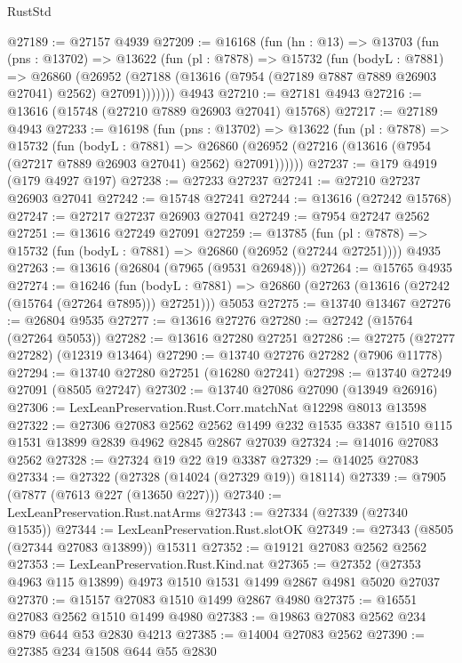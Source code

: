 \begin{lexlean}{RustStd}
\begin{coremodule}
@27189 := @27157 @4939
@27209 := @16168
    (fun (hn : @13) =>
    @13703
      (fun (pns : @13702) =>
      @13622
        (fun (pl : @7878) =>
        @15732
          (fun (bodyL : @7881) =>
          @26860
            (@26952 (@27188 (@13616 (@7954 (@27189 @7887 @7889 @26903 @27041) @2562) @27091)))))))
    @4943
@27210 := @27181 @4943
@27216 := @13616 (@15748 (@27210 @7889 @26903 @27041) @15768)
@27217 := @27189 @4943
@27233 := @16198
    (fun (pns : @13702) =>
    @13622
      (fun (pl : @7878) =>
      @15732
        (fun (bodyL : @7881) =>
        @26860 (@26952 (@27216 (@13616 (@7954 (@27217 @7889 @26903 @27041) @2562) @27091))))))
@27237 := @179 @4919 (@179 @4927 @197)
@27238 := @27233 @27237
@27241 := @27210 @27237 @26903 @27041
@27242 := @15748 @27241
@27244 := @13616 (@27242 @15768)
@27247 := @27217 @27237 @26903 @27041
@27249 := @7954 @27247 @2562
@27251 := @13616 @27249 @27091
@27259 := @13785
    (fun (pl : @7878) => @15732 (fun (bodyL : @7881) => @26860 (@26952 (@27244 @27251))))
    @4935
@27263 := @13616 (@26804 (@7965 (@9531 @26948)))
@27264 := @15765 @4935
@27274 := @16246
    (fun (bodyL : @7881) => @26860 (@27263 (@13616 (@27242 (@15764 (@27264 @7895))) @27251)))
    @5053
@27275 := @13740 @13467
@27276 := @26804 @9535
@27277 := @13616 @27276
@27280 := @27242 (@15764 (@27264 @5053))
@27282 := @13616 @27280 @27251
@27286 := @27275 (@27277 @27282) (@12319 @13464)
@27290 := @13740 @27276 @27282 (@7906 @11778)
@27294 := @13740 @27280 @27251 (@16280 @27241)
@27298 := @13740 @27249 @27091 (@8505 @27247)
@27302 := @13740 @27086 @27090 (@13949 @26916)
@27306 := LexLeanPreservation.Rust.Corr.matchNat @12298 @8013 @13598
@27322 := @27306
    @27083
    @2562
    @2562
    @1499
    @232
    @1535
    @3387
    @1510
    @115
    @1531
    @13899
    @2839
    @4962
    @2845
    @2867
    @27039
@27324 := @14016 @27083 @2562
@27328 := @27324 @19 @22 @19 @3387
@27329 := @14025 @27083
@27334 := @27322 (@27328 (@14024 (@27329 @19)) @18114)
@27339 := @7905 (@7877 (@7613 @227 (@13650 @227)))
@27340 := LexLeanPreservation.Rust.natArms
@27343 := @27334 (@27339 (@27340 @1535))
@27344 := LexLeanPreservation.Rust.slotOK
@27349 := @27343 (@8505 (@27344 @27083 @13899)) @15311
@27352 := @19121 @27083 @2562 @2562
@27353 := LexLeanPreservation.Rust.Kind.nat
@27365 := @27352 (@27353 @4963 @115 @13899) @4973 @1510 @1531 @1499 @2867 @4981 @5020 @27037
@27370 := @15157 @27083 @1510 @1499 @2867 @4980
@27375 := @16551 @27083 @2562 @1510 @1499 @4980
@27383 := @19863 @27083 @2562 @234 @879 @644 @53 @2830 @4213
@27385 := @14004 @27083 @2562
@27390 := @27385 @234 @1508 @644 @55 @2830

\end{coremodule}
\end{lexlean}
